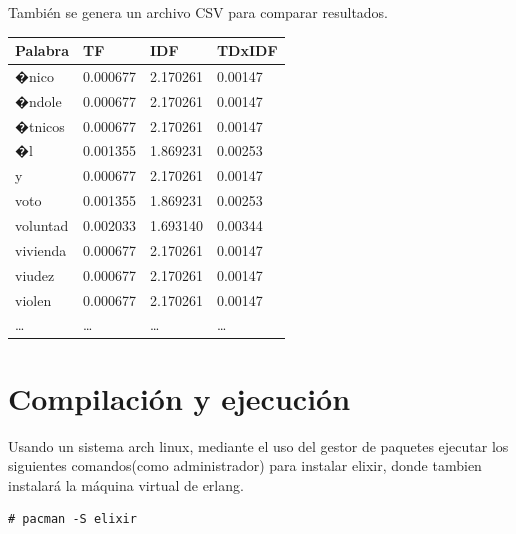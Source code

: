\documentclass{IEEEtran}
\begin{document}
También se genera un archivo CSV para comparar resultados.
\begin{table}[H]
  \centering{}
  \begin{tabular}{|l|l|l|l|}
    \hline
    Palabra  & TF                & IDF              & TDxIDF            \\ \hline
    �nico    & 0.000677 & 2.170261 & 0.00147 \\ \hline
    �ndole   & 0.000677 & 2.170261 & 0.00147 \\ \hline
    �tnicos  & 0.000677 & 2.170261 & 0.00147 \\ \hline
    �l       & 0.001355  & 1.869231 & 0.00253 \\ \hline
    y        & 0.000677 & 2.170261 & 0.00147 \\ \hline
    voto     & 0.001355  & 1.869231 & 0.00253 \\ \hline
    voluntad & 0.002033 & 1.693140  & 0.00344 \\ \hline
    vivienda & 0.000677 & 2.170261 & 0.00147 \\ \hline
    viudez   & 0.000677 & 2.170261 & 0.00147 \\ \hline
    violen   & 0.000677 & 2.170261 & 0.00147 \\ \hline
    \ldots   & \ldots & \ldots & \ldots \\ \hline
  \end{tabular}



\end{table}

\section{Compilación y ejecución}\label{sec:compilacion}

Usando un sistema arch linux,
mediante el uso del gestor de paquetes ejecutar los siguientes
comandos(como administrador) para instalar elixir, donde tambien instalará
la máquina virtual de erlang.

\begin{verbatim}
# pacman -S elixir
\end{verbatim}
\end{document}
